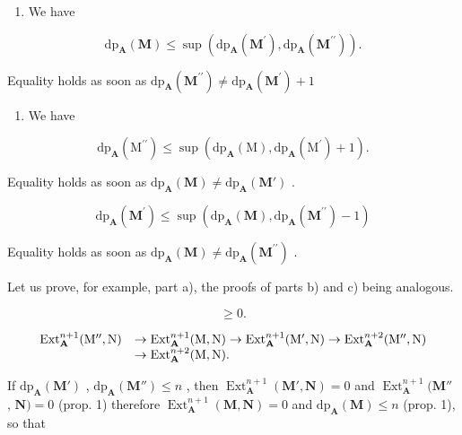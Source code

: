 \begin{enumerate}
\def\labelenumi{\alph{enumi})}
\tightlist
\item
  We have
\end{enumerate}

\[
\mathrm{dp} _ {\mathbf {A}} (\mathbf {M}) \leqslant \sup \left(\mathrm{dp} _ {\mathbf {A}} (\mathbf {M} ^ {\prime}), \mathrm{dp} _ {\mathbf {A}} (\mathbf {M} ^ {\prime \prime})\right).
\]

Equality holds as soon as \(\mathrm{dp}_{\mathbf{A}}(\mathbf{M}^{\prime \prime})\neq \mathrm{dp}_{\mathbf{A}}(\mathbf{M}^{\prime}) + 1\)

\begin{enumerate}
\def\labelenumi{\alph{enumi})}
\setcounter{enumi}{1}
\tightlist
\item
  We have
\end{enumerate}

\[
\mathrm{dp} _ {\mathbf {A}} \left(\mathrm{M} ^ {\prime \prime}\right) \leqslant \sup \left(\mathrm{dp} _ {\mathbf {A}} (\mathrm{M}), \mathrm{dp} _ {\mathbf {A}} \left(\mathrm{M} ^ {\prime}\right) + 1\right).
\]

Equality holds as soon as \(\mathrm{dp}_{\mathbf{A}}(\mathbf{M}) \neq \mathrm{dp}_{\mathbf{A}}(\mathbf{M}')\) .

\[
\mathrm{dp} _ {\mathbf {A}} \left(\mathbf {M} ^ {\prime}\right) \leqslant \sup \left(\mathrm{dp} _ {\mathbf {A}} (\mathbf {M}), \mathrm{dp} _ {\mathbf {A}} \left(\mathbf {M} ^ {\prime \prime}\right) - 1\right)
\]

Equality holds as soon as \(\mathrm{dp}_{\mathbf{A}}(\mathbf{M}) \neq \mathrm{dp}_{\mathbf{A}}(\mathbf{M}^{\prime \prime})\) .

Let us prove, for example, part a), the proofs of parts b) and c) being analogous.

\[
\geqslant 0.
\]

\[
\begin{array}{r l}\operatorname{Ext} _ {\mathbf {A}} ^ {n + 1} (\mathrm{M} ^ {\prime \prime}, \mathrm{N})&\rightarrow \operatorname{Ext} _ {\mathbf {A}} ^ {n + 1} (\mathrm{M}, \mathrm{N}) \rightarrow \operatorname{Ext} _ {\mathbf {A}} ^ {n + 1} (\mathrm{M} ^ {\prime}, \mathrm{N}) \rightarrow \operatorname{Ext} _ {\mathbf {A}} ^ {n + 2} (\mathrm{M} ^ {\prime \prime}, \mathrm{N})\\&\rightarrow \operatorname{Ext} _ {\mathbf {A}} ^ {n + 2} (\mathrm{M}, \mathrm{N}).\end{array}
\]

If \(\mathrm{dp}_{\mathbf{A}}(\mathbf{M}')\) , \(\mathrm{dp}_{\mathbf{A}}(\mathbf{M}'')\leqslant n\) , then \(\operatorname{Ext}_{\mathbf{A}}^{n+1}(\mathbf{M}',\mathbf{N})=0\) and \(\operatorname{Ext}_{\mathbf{A}}^{n+1}(\mathbf{M}''\) , \(\mathbf{N})=0\) (prop. 1) therefore \(\operatorname{Ext}_{\mathbf{A}}^{n+1}(\mathbf{M},\mathbf{N})=0\) and \(\mathrm{dp}_{\mathbf{A}}(\mathbf{M})\leqslant n\) (prop. 1), so that

